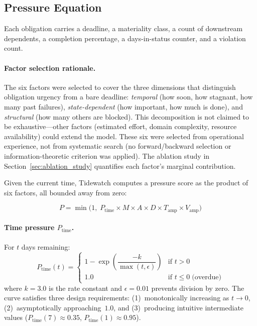 \documentclass[11pt]{article}
\begin{document}
\subsection{Pressure Equation}
\label{sec:pressure}

Each obligation carries a deadline, a materiality class, a count of
downstream dependents, a completion percentage, a days-in-status
counter, and a violation count.

\paragraph{Factor selection rationale.}
The six factors were selected to cover the three dimensions that
distinguish obligation urgency from a bare deadline: \emph{temporal}
(how soon, how stagnant, how many past failures),
\emph{state-dependent} (how important, how much is done), and
\emph{structural} (how many others are blocked).  This decomposition
is not claimed to be exhaustive---other factors (estimated effort,
domain complexity, resource availability) could extend the model.
These six were selected from operational experience, not from
systematic search (no forward/backward selection or
information-theoretic criterion was applied).
The ablation study in Section~\ref{sec:ablation_study} quantifies
each factor's marginal contribution.

Given the current time, Tidewatch computes a pressure score as the
product of six factors, all bounded away from zero:

\begin{equation}
\label{eq:pressure}
P = \min\!\bigl(1,\;
  P_{\text{time}} \times M \times A \times D
  \times T_{\text{amp}} \times V_{\text{amp}}\bigr)
\end{equation}

\paragraph{Time pressure $P_{\text{time}}$.}
For $t$ days remaining:
\begin{equation}
\label{eq:time}
P_{\text{time}}(t) =
\begin{cases}
  1 - \exp\!\left(\dfrac{-k}{\max(t, \epsilon)}\right)
    & \text{if } t > 0 \\[6pt]
  1.0 & \text{if } t \leq 0 \;\text{(overdue)}
\end{cases}
\end{equation}
where $k = 3.0$ is the rate constant and $\epsilon = 0.01$ prevents
division by zero.
The curve satisfies three design requirements:
(1)~monotonically increasing as $t \to 0$,
(2)~asymptotically approaching~$1.0$, and
(3)~producing intuitive intermediate values
($P_{\text{time}}(7) \approx 0.35$,
 $P_{\text{time}}(1) \approx 0.95$).
\end{document}
